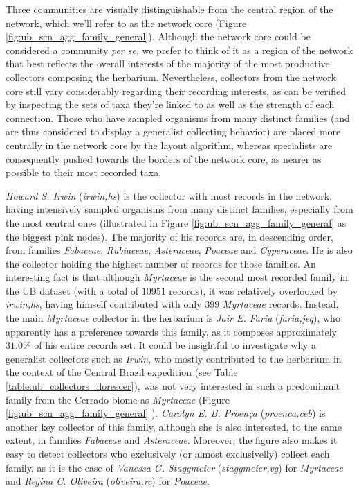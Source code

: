 Three communities are visually distinguishable from the central region of the network, which we'll refer to as the network core (Figure \ref{fig:ub_scn_agg_family_general}).
Although the network core could be considered a community \textit{per se}, we prefer to think of it as a region of the network that best reflects the overall interests of the majority of the most productive collectors composing the herbarium.
Nevertheless, collectors from the network core still vary considerably regarding their recording interests, as can be verified by inspecting the sets of taxa they're linked to as well as the strength of each connection. 
Those who have sampled organisms from many distinct families (and are thus considered to display a generalist collecting behavior) are placed more centrally in the network core by the layout algorithm, whereas specialists are consequently pushed towards the borders of the network core, as nearer as possible to their most recorded taxa.

\textit{Howard S. Irwin} (\textit{irwin,hs}) is the collector with most records in the network, having intensively sampled organisms from many distinct families, especially from the most central ones (illustrated in Figure \ref{fig:ub_scn_agg_family_general} as the biggest pink nodes).
The majority of his records are, in descending order, from families \textit{Fabaceae}, \textit{Rubiaceae}, \textit{Asteraceae}, \textit{Poaceae} and \textit{Cyperaceae}. 
He is also the collector holding the highest number of records for those families.
An interesting fact is that although \textit{Myrtaceae} is the second most recorded family in the UB dataset (with a total of $10951$ records), it was relatively overlooked by \textit{irwin,hs}, having himself contributed with only $399$ \textit{Myrtaceae} records. 
Instead, the main \textit{Myrtaceae} collector in the herbarium is \textit{Jair E. Faria} (\textit{faria,jeq}), who apparently has a preference towards this family, as it composes approximately $31.0\%$ of his entire records set. 
It could be insightful to investigate why a generalist collectors such as \textit{Irwin}, who mostly contributed to the herbarium in the context of the Central Brazil expedition (see Table \ref{table:ub_collectors_florescer}), was not very interested in such a predominant family from the Cerrado biome as \textit{Myrtaceae} (Figure \ref{fig:ub_scn_agg_family_general} ).
\textit{Carolyn E. B. Proença} (\textit{proenca,ceb}) is another key collector of this family, although she is also interested, to the same extent, in families \textit{Fabaceae} and \textit{Asteraceae}. 
Moreover, the figure also makes it easy to detect collectors who exclusively (or almost exclusivelly) collect each family, as it is the case of \textit{Vanessa G. Staggmeier} (\textit{staggmeier,vg}) for \textit{Myrtaceae} and \textit{Regina C. Oliveira} (\textit{oliveira,rc}) for \textit{Poaceae}.

